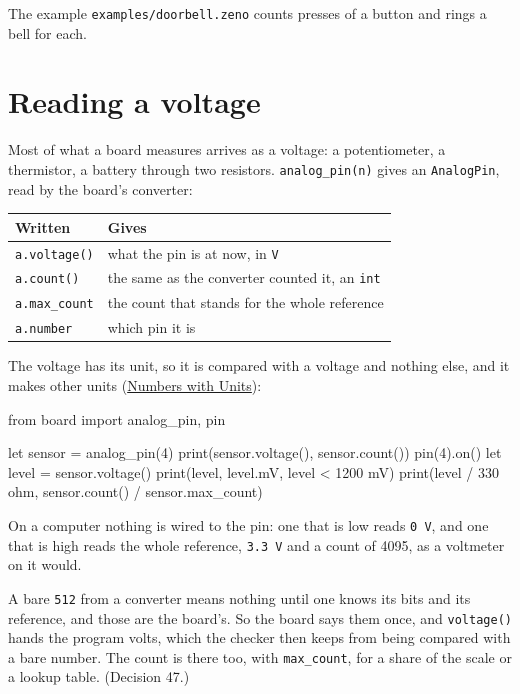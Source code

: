 The example \verb|examples/doorbell.zeno| counts presses of a button
and rings a bell for each.

\section{Reading a voltage}

Most of what a board measures arrives as a voltage: a potentiometer,
a thermistor, a battery through two resistors. \verb|analog_pin(n)|
gives an \verb|AnalogPin|, read by the board's converter:

\begin{center}
\begin{tabular}{ll}
\toprule
Written & Gives \\
\midrule
\verb|a.voltage()| & what the pin is at now, in \verb|V| \\
\verb|a.count()| & the same as the converter counted it, an \verb|int| \\
\verb|a.max_count| & the count that stands for the whole reference \\
\verb|a.number| & which pin it is \\
\bottomrule
\end{tabular}
\end{center}

The voltage has its unit, so it is compared with a voltage and
nothing else, and it makes other units
(\hyperref[ch-units]{Numbers with Units}):

\begin{zeno}
from board import analog_pin, pin

let sensor = analog_pin(4)
print(sensor.voltage(), sensor.count())
pin(4).on()
let level = sensor.voltage()
print(level, level.mV, level < 1200 mV)
print(level / 330 ohm, sensor.count() / sensor.max_count)
\end{zeno}

On a computer nothing is wired to the pin: one that is low reads
\verb|0 V|, and one that is high reads the whole reference,
\verb|3.3 V| and a count of 4095, as a voltmeter on it would.

\begin{why}
A bare \verb|512| from a converter means nothing until one knows its
bits and its reference, and those are the board's. So the board says
them once, and \verb|voltage()| hands the program volts, which the
checker then keeps from being compared with a bare number. The count
is there too, with \verb|max_count|, for a share of the scale or a
lookup table. (Decision 47.)
\end{why}

